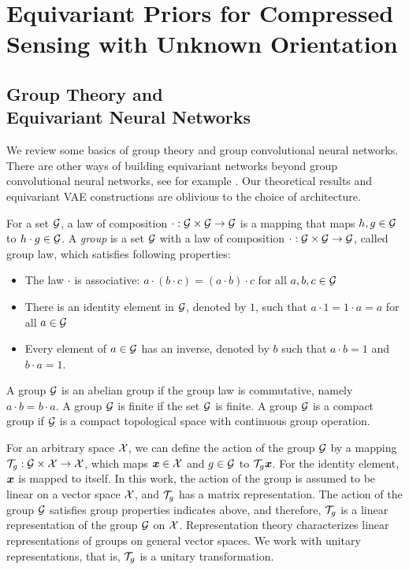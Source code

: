 \newpage

\chapter{Equivariant Priors for Compressed Sensing with Unknown Orientation} 
\newpage
\section[Group Theory and Equivariant Neural Networks]{Group Theory and \\ Equivariant Neural Networks}

We review some basics of group theory and group convolutional neural networks. There are other ways of building equivariant networks beyond group convolutional neural networks, see for example \cite{e2cnn,cohen_steerable_2016,Kondor2018-GENERAL,cesa2022a}. Our theoretical results and equivariant VAE constructions are oblivious to the choice of architecture. 

For a set ${\mathcal{G}}$, a law of composition $\cdot : {\mathcal{G}} \times {\mathcal{G}} \to {\mathcal{G}}$ is a mapping that maps $h, g\in{\mathcal{G}}$ to $h \cdot g\in{\mathcal{G}}$. A \textit{group} is a set ${\mathcal{G}}$ with a  law of composition $\cdot : {\mathcal{G}} \times {\mathcal{G}} \to {\mathcal{G}}$, called {group law},  which satisfies following properties:
    \begin{itemize}
        \item The law $\cdot$ is associative: $a \cdot (b \cdot c) = (a \cdot b) \cdot c$ for all $ a, b, c \in {\mathcal{G}}$
        \item There is an identity element in ${\mathcal{G}}$, denoted by $1$, such that $a \cdot 1 = 1 \cdot a = a$ for all $a\in{\mathcal{G}}$
        \item Every element of $a\in{\mathcal{G}}$ has an inverse, denoted by $b$ such that $a\cdot b=1$ and $b\cdot a=1$.
    \end{itemize}

A group ${\mathcal{G}}$ is an abelian group if the group law is {commutative}, namely $a\cdot b =b \cdot a$. 
A group ${\mathcal{G}}$ is {finite} if the set ${\mathcal{G}}$ is finite. A group ${\mathcal{G}}$ is a {compact} group if ${\mathcal{G}}$ is a compact topological space with continuous group operation.

For an arbitrary space ${\mathcal{X}}$, we can define the action of the group ${\mathcal{G}}$ by a mapping ${\mathcal{T}}_g: {\mathcal{G}} \times {\mathcal{X}} \to {\mathcal{X}}$, which maps ${\bm{x}}\in{\mathcal{X}}$ and $g\in{\mathcal{G}}$ to ${\mathcal{T}}_g{\bm{x}}$. For the identity element, ${\bm{x}}$ is mapped to itself. In this work, the action of the group is assumed to be linear on a vector space ${\mathcal{X}}$, and ${\mathcal{T}}_g$ has a matrix representation. The action of the group ${\mathcal{G}}$ satisfies group properties indicates above, and therefore, ${\mathcal{T}}_g$ is a linear representation of the group ${\mathcal{G}}$ on ${\mathcal{X}}$. Representation theory characterizes linear representations of groups on general vector spaces. We work with unitary representations, that is,  ${\mathcal{T}}_g$ is a unitary transformation.



